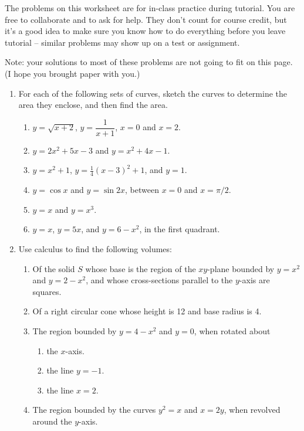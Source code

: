 \documentclass[12pt]{article}
\begin{document}
\thispagestyle{fancy}
The problems on this worksheet are for in-class practice during tutorial. You are free to collaborate and to ask for help. They don't count for course credit, but it's a good idea to make sure you know how to do everything before you leave tutorial -- similar problems may show up on a test or assignment.

\bigskip

Note: your solutions to most of these problems are not going to fit on this page. (I hope you brought paper with you.)

\begin{enumerate}
 \item For each of the following sets of curves, sketch the curves to determine the area they enclose, and then find the area.
\begin{enumerate}
 \item $y=\sqrt{x+2}$, $y=\dfrac{1}{x+1}$, $x=0$ and $x=2$.
 \item $y=2x^2+5x-3$ and $y=x^2+4x-1$.
 \item $y=x^2+1$, $y=\frac{1}{4}(x-3)^2+1$, and $y=1$.
 \item $y=\cos x$ and $y=\sin 2x$, between $x=0$ and $x=\pi/2$.
 \item $y=x$ and $y=x^3$.
 \item $y=x$, $y=5x$, and $y=6-x^2$, in the first quadrant. 
\end{enumerate}
\item Use calculus to find the following volumes:
\begin{enumerate}
 \item Of the solid $S$ whose base is the region of the $xy$-plane bounded by $y=x^2$ and $y=2-x^2$, and whose cross-sections parallel to the $y$-axis are squares.
 \item Of a right circular cone whose height is 12 and base radius is 4.
 \item The region bounded by $y=4-x^2$ and $y=0$, when rotated about
\begin{enumerate}
 \item the $x$-axis.
 \item the line $y=-1$.
 \item the line $x=2$.
\end{enumerate}
 \item The region bounded by the curves $y^2=x$ and $x=2y$, when revolved around the $y$-axis.
\end{enumerate}

\end{enumerate}
\end{document}
